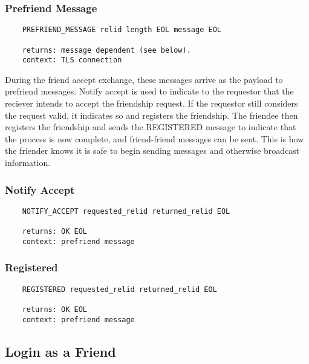 \documentclass[letterpaper,11pt,oneside]{article}
\begin{document}
\subsubsection{Prefriend Message}

\vspace{10pt}
\begin{verbatim}
    PREFRIEND_MESSAGE relid length EOL message EOL

    returns: message dependent (see below).
    context: TLS connection
\end{verbatim}
\vspace{10pt}

During the friend accept exchange, these messages arrive as the payload to
prefriend messages. Notify accept is used to indicate to the requestor that the
reciever intends to accept the friendship request. If the requestor still
considers the request valid, it indicates so and registers the friendship. The
friendee then registers the friendship and sends the REGISTERED message to
indicate that the process is now complete, and friend-friend messages can be
sent. This is how the friender knows it is safe to begin sending messages and
otherwise broadcast information.

\subsubsection{Notify Accept}

\vspace{10pt}
\begin{verbatim}
    NOTIFY_ACCEPT requested_relid returned_relid EOL

    returns: OK EOL
    context: prefriend message
\end{verbatim}
\vspace{10pt}

\subsubsection{Registered}

\vspace{10pt}
\begin{verbatim}
    REGISTERED requested_relid returned_relid EOL

    returns: OK EOL
    context: prefriend message
\end{verbatim}

\subsection{Login as a Friend}
\end{document}
